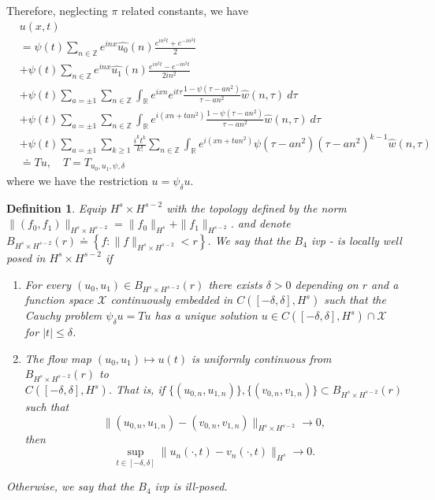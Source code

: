 \documentclass[12pt,reqno]{amsart}
\numberwithin{equation}{section}  %
\renewcommand{\cref}{\Cref}
\newcommand{\rr}{\mathbb{R}}
\newcommand{\zz}{\mathbb{Z}}
\newcommand{\wh}{\widehat}
\newtheorem{definition}[theorem]{Definition}
\begin{document}
%
%
Therefore, neglecting $\pi$ related constants, we have
%
%
%
\begin{align}
  & u(x,t)
  \label{main1-rel-term-0}
  \\
  \label{main1-rel-term-1}
  & = \psi(t) \sum_{n \in \zz} e^{inx} \wh{u_{0}}(n) \frac{e^{in^{2}t} + e^{-in^{2}t}}{2} 
  \\
  \label{main1-rel-term-2}
  & + \psi(t) \sum_{n \in \zz} e^{inx}
  \wh{u_{1}}(n)\frac{e^{in^{2}t} - e^{-in^{2}t}}{2 i n^{2}} 
  \\
  \label{main1-rel-term-3}
  & +  \psi(t)\sum_{a = \pm 1} \sum_{n\in \zz} \int_\rr e^{ixn}  
  e^{it \tau} \frac{1 - \psi(\tau -  an^{2}) 
}{\tau -  an^{2}} \wh{w}(n, \tau) \ d \tau
  \\
  \label{main1-rel-term-4}
  & + \psi(t) \sum_{a = \pm 1} \sum_{n\in \zz} \int_\rr e^{i(xn + 
  t an^{2})}
  \frac{1- \psi(\tau -  an^{2})}{\tau -  an^{2}} \wh{w}(n, \tau) \ d \tau
  \\
  \label{main1-rel-term-4.5}
  & +  \psi(t) \sum_{a = \pm 1}  \sum_{k \ge 1} \frac{i^k t^k}{k!}
  \sum_{n \in \zz} \int_\rr e^{i(xn + t an^{2} )}
  \psi(\tau -  an^{2}) (\tau -  an^{2})^{k-1} \wh{w}(n, \tau)
  \\
  \label{main1-rel-term-5}
  & \doteq Tu, \quad T=T_{u_0, u_1, \psi, \delta}
\end{align}
%
%
where we have the restriction $u = \psi_{\delta}u$.
%
%
%
%
%
%
\begin{definition}
  Equip $H^{s} \times H^{s-2}$ with the 
  topology defined by the norm $\|(f_0, f_1)\|_{H^{s} \times H^{s-2}}
  = \|f_0\|_{H^{s}} + \|f_1\|_{H^{s-2}}$.
  and denote $B_{H^{s} \times H^{s-2}}(r) \doteq \left\{f: \| f \|_{H^{s} \times
  H^{s-2}} < r
  \right\}$. We say that the $B_{4}$ ivp
  \cref{eqn:mb-2}-\cref{eqn:mb-init-data-2} is
	\emph{locally well posed} in
  $H^s \times H^{s-2}$ if 
	\begin{enumerate}
    \item For every $(u_{0}, u_{1}) \in B_{H^{s} \times H^{s-2}}(r)$
      there exists $\delta>0$ depending on $r$ and a function space
      $\mathcal{X}$ continuously embedded in $C([-\delta,
      \delta], H^s)$ such that the Cauchy problem
      $\psi_{\delta} u = Tu$ has a unique solution $u \in C([-\delta,
      \delta], H^s) \cap \mathcal{X}$ for $ |t| \le \delta$.
    \item
      The flow map $(u_0, u_{1}) \mapsto u(t)$ is uniformly continuous from
      $B_{H^{s} \times H^{s-2}}(r)$ to \\ $C(\left[ -\delta, \delta \right], H^s)$. That is, if
      $\{(u_{0,n}, u_{1,n} ) \}, \{(v_{0,n}, v_{1,n} )\}
      \subset B_{H^{s} \times H^{s-2}}(r)$ such that $$\|(u_{0,n}, u_{1,n}) -
      (v_{0,n}, v_{1,n}) \|_{H^{s} \times H^{s-2}} \to 0,$$ then 
      $$\sup_{t \in [-\delta, \delta]}
      \|u_{n}(\cdot, t) - v_{n}(\cdot, t) \|_{H^s} \to 0.$$
  \end{enumerate}
	Otherwise, we say that the $B_{4}$ ivp is \emph{ill-posed}.
\end{definition}
\end{document}
